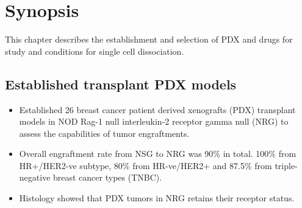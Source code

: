 
\section{Synopsis}
This chapter describes the establishment and selection of PDX and drugs for study and conditions for single cell dissociation. 
 
 
 \subsection{Established transplant PDX models}
 \begin{itemize}
  \item Established 26 breast cancer patient derived xenografts (PDX) transplant models in NOD Rag-1 null interleukin-2 receptor gamma null (NRG) to assess the capabilities of tumor engraftments. 
  \item Overall engraftment rate from NSG to NRG was 90\% in total. 100\% from HR+/HER2-ve subtype,  80\% from HR-ve/HER2+ and 87.5\% from triple-negative breast cancer types (TNBC).
   \item Histology showed that PDX tumors in NRG retains their receptor status.
  
  \end{itemize}
  
